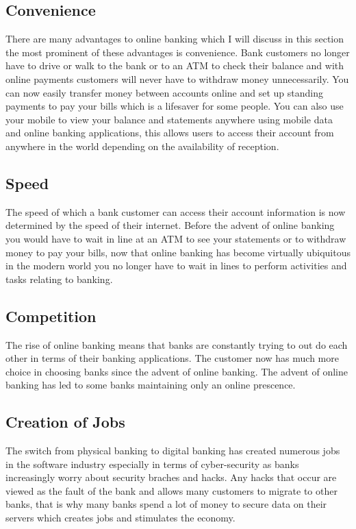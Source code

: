 \subsection{Convenience}
There are many advantages to online banking which I will discuss in this section
the most prominent of these advantages is convenience.  Bank customers no longer
have to drive or walk to the bank or to an ATM to check their balance and with online
payments customers will never have to withdraw money unnecessarily.  You can now
easily transfer money between accounts online and set up standing payments to pay
your bills which is a lifesaver for some people. You can also use your mobile to
view your balance and statements anywhere using mobile data and online banking applications,
this allows users to access their account from anywhere in the world depending on the
availability of reception.
\subsection{Speed}
The speed of which a bank customer can access their account information is now
determined by the speed of their internet.  Before the advent of online banking
you would have to wait in line at an ATM to see your statements or to withdraw
money to pay your bills, now that online banking has become virtually ubiquitous
in the modern world you no longer have to wait in lines to perform activities and
tasks relating to banking.
\subsection{Competition}
The rise of online banking means that banks are constantly trying to out do each
other in terms of their banking applications.  The customer now has much more choice
in choosing banks since the advent of online banking. The advent of online banking has
led to some banks maintaining only an online prescence.\cite{OnlineBanking}
\subsection{Creation of Jobs}
The switch from physical banking to digital banking has created numerous jobs
in the software industry especially in terms of cyber-security as banks increasingly
worry about security braches and hacks.  Any hacks that occur are viewed as the fault
of the bank and allows many customers to migrate to other banks, that is why many banks
spend a lot of money to secure data on their servers which creates jobs and stimulates
the economy.

